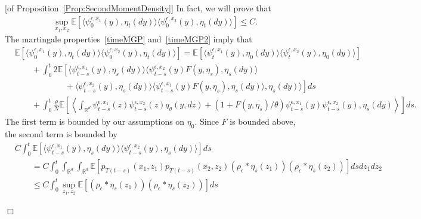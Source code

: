 \documentclass[12pt]{article}
\newenvironment {proof}{{\noindent\bf Proof }}{\hfill $\Box$ \medskip}
\newcommand{\IE}{\mathbb E}
\newcommand{\IR}{\mathbb R}
\begin{document}
\begin{proof}[of Proposition~\ref{Prop:SecondMomentDensity}]
    In fact, we will prove that
    \begin{align*}
        \sup_{x_1, x_2} \IE\left[
            \langle \psi^{\epsilon,x_1}_0(y), \eta_t(dy) \rangle
            \langle \psi^{\epsilon,x_2}_0(y), \eta_t(dy) \rangle
        \right]
        \le C .
    \end{align*}
    The martingale properties~\eqref{timeMGP} and~\eqref{timeMGP2} imply that
    \begin{align*}
        &
        \IE\left[
            \langle \psi^{\epsilon,x_1}_0(y), \eta_t(dy) \rangle
            \langle \psi^{\epsilon,x_2}_0(y), \eta_t(dy) \rangle
        \right]
        =
        \IE\left[
            \langle \psi^{\epsilon,x_1}_t(y), \eta_0(dy) \rangle
            \langle \psi^{\epsilon,x_2}_t(y), \eta_0(dy) \rangle
        \right]
        \\ & \qquad {}
        +
        \int_0^t 2 \IE\left[
            \langle \psi^{\epsilon,x_1}_{t-s}(y), \eta_s(dy) \rangle
            \langle \psi^{\epsilon,x_2}_{t-s}(y) F(y, \eta_s), \eta_s(dy) \rangle
        \right. \\ & \qquad \qquad \qquad \left. {} 
            +
            \langle \psi^{\epsilon,x_2}_{t-s}(y), \eta_s(dy) \rangle
            \langle \psi^{\epsilon,x_1}_{t-s}(y) F(y, \eta_s), \eta_s(dy) \rangle
            ,
            \eta_s(dy) \rangle
        \right] ds
        \\ & \qquad {}
        +
        \int_0^t \frac{\theta}{N} \IE\left[
            \left\langle 
                \int_{\IR^d}
                    \psi^{\epsilon,x_1}_{t-s}(z)
                    \psi^{\epsilon,x_2}_{t-s}(z)
                    q_\theta(y, dz)
                +
                \left(1 + F(y, \eta_s)/\theta \right)
                    \psi^{\epsilon,x_1}_{t-s}(y)
                    \psi^{\epsilon,x_2}_{t-s}(y)
                ,
                \eta_s(dy)
            \right\rangle
        \right] ds .
    \end{align*}
    The first term is bounded by our assumptions on $\eta_0$.
    Since $F$ is bounded above, the second term is bounded by
    \begin{align*}
        &C \int_0^t \IE\left[
            \langle \psi^{\epsilon,x_1}_{t-s}(y), \eta_s(dy) \rangle
            \langle \psi^{\epsilon,x_2}_{t-s}(y), \eta_s(dy) \rangle
        \right] ds
        \\
        &\qquad =
        C \int_0^t
        \int_{\IR^d} \int_{\IR^d}
            \IE\left[
                p_{T(t-s)}(x_1, z_1) p_{T(t-s)}(x_2, z_2)
                (\rho_\epsilon * \eta_s(z_1))
                (\rho_\epsilon * \eta_s(z_2))
            \right] ds
        dz_1 dz_2
        \\
        &\qquad \le
        C \int_0^t
        \sup_{z_1, z_2}
            \IE\left[
                (\rho_\epsilon * \eta_s(z_1))
                (\rho_\epsilon * \eta_s(z_2))
            \right] ds
    \end{align*}


\end{proof}
\end{document}
